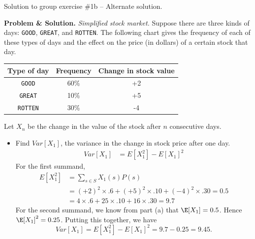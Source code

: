 \documentclass[10pt]{beamer}
\begin{document}
\begin{frame}{Solution to group exercise \#1b -- Alternate solution.}
\footnotesize 

\textbf{Problem \& Solution.} \textit{Simplified stock market.} Suppose there are three kinds of days: \texttt{GOOD}, \texttt{GREAT}, and \texttt{ROTTEN}. The following chart gives the frequency of each of these types of days and the effect on the price (in dollars) of a certain stock that day.
	\vspace{-.2cm}
	\begin{table}[H]
	\begin{tabular}{|c|c|c|}
	\toprule 
	\colorbox{blue!30}{Type of day} & 	\colorbox{blue!30}{Frequency} & \colorbox{blue!30}{Change in stock value} \\
	\midrule 
	\texttt{GOOD} & 60\% & +2 \\
	\texttt{GREAT} & 10\% & +5 \\
	\texttt{ROTTEN} & 30\% & -4 \\
	\bottomrule 
	\end{tabular}
	\end{table}
	\vspace{-.2cm}
	Let $X_n$ be the change in the value of the stock after $n$ consecutive days.
		\vspace{-.2cm}
	 \begin{itemize} \footnotesize 
	\item[b.] Find  $Var[X_1]$, the variance in the change in stock price after one day.
	\begin{align*}
	 Var[X_1] &= E[X_1^2] - E[X_1]^2
	 \end{align*}
	For the first summand,  
	\begin{align*}
	E[X_1^2] &= \sum_{s \in S} X_1(s) P(s)  \\
	 &= (+2)^2 \times .6 + 	(+5)^2 \times .10 + (-4)^2 \times .30 = 0.5 \\
	 &= 4 \times .6 + 	25 \times .10 + 16 \times .30 = 9.7 
	 \end{align*}
	 For the second summand, we know  from part (a) that $\E[X_1]=0.5$. Hence $\E[X_1]^2=0.25$.  Putting this together, we have
	 \[  Var[X_1] = E[X_1^2] - E[X_1]^2 = 9.7-0.25 = 9.45.\]
	\end{itemize}
\end{frame}
\end{document}
